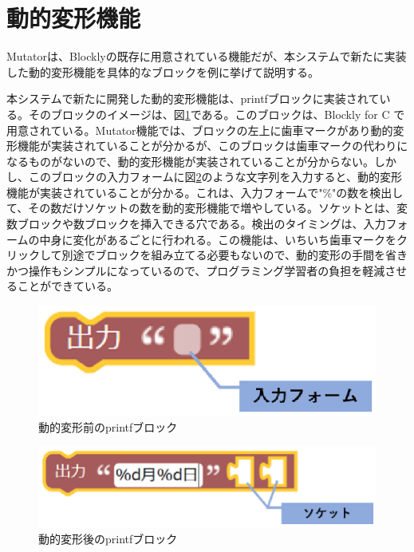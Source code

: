 \documentclass{eniepaper}
\begin{document}
   \section{動的変形機能}
   
Mutatorは、Blocklyの既存に用意されている機能だが、本システムで新たに実装した動的変形機能を具体的なブロックを例に挙げて説明する。

本システムで新たに開発した動的変形機能は、printfブロックに実装されている。そのブロックのイメージは、図\ref{fig:output}である。このブロックは、Blockly for C で用意されている。Mutator機能では、ブロックの左上に歯車マークがあり動的変形機能が実装されていることが分かるが、このブロックは歯車マークの代わりになるものがないので、動的変形機能が実装されていることが分からない。しかし、このブロックの入力フォームに図\ref{fig:output2}のような文字列を入力すると、動的変形機能が実装されていることが分かる。これは、入力フォームで"\%"の数を検出して、その数だけソケットの数を動的変形機能で増やしている。ソケットとは、変数ブロックや数ブロックを挿入できる穴である。検出のタイミングは、入力フォームの中身に変化があるごとに行われる。この機能は、いちいち歯車マークをクリックして別途でブロックを組み立てる必要もないので、動的変形の手間を省きかつ操作もシンプルになっているので、プログラミング学習者の負担を軽減させることができている。

\begin{figure}[h]
\begin{center}
\includegraphics[scale=0.5]{img/output.eps}
\caption{動的変形前のprintfブロック}%
\label{fig:output}
\end{center}%
\end{figure}%

\begin{figure}[h]
\begin{center}
\includegraphics[scale=0.5]{img/output2.eps}
\caption{動的変形後のprintfブロック}%
\label{fig:output2}
\end{center}%
\end{figure}%
   
\end{document}
